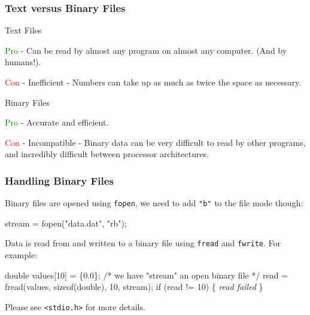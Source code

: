 \documentclass[table]{beamer}
\newif\ifschigh\schighfalse
\newcommand{\kw}[1]{\ifschigh\textcolor{red}{#1}\else\textcolor{keyword}{#1}\fi}
\newcommand{\kt}[1]{\ifschigh\textcolor{red}{#1}\else\textcolor{ctext}{#1}\fi}
\newcommand{\kc}[1]{\ifschigh\textcolor{red}{#1}\else\textcolor{comment}{#1}\fi}
\begin{document}
\begin{frame}
\frametitle{Text versus Binary Files}
\begin{block}{Text Files}
\begin{itemize}
{
\item \textcolor{green}{Pro} - Can be read by almost any program on almost any computer. (And by humans!).
}
{
\item \textcolor{red}{Con} - Inefficient - Numbers can take up as much as twice the space as necessary.}
\end{itemize}
\end{block}

\begin{block}{Binary Files}
\begin{itemize}
{
\item \textcolor{green}{Pro} - Accurate and efficient.
}
{
\item \textcolor{red}{Con} - Incompatible - Binary data can be very difficult to read by other programs, and incredibly difficult between processor architectures.}
\end{itemize}
\end{block}
\end{frame}

\begin{frame}[fragile]
\frametitle{Handling Binary Files}
Binary files are opened using {\tt fopen}, we need to add {\tt "b"} to the file mode though:
\begin{semiverbatim}
stream = fopen(\kt{"data.dat"}, \kt{"rb"});
\end{semiverbatim}
Data is read from and written to a binary file using {\tt fread} and {\tt fwrite}. For example:
\begin{semiverbatim}
\kw{double} values[10] = \{0.0\};
\kc{/* we have "stream" an open binary file */}
read = fread(values, \kw{sizeof}(\kw{double}), 10, stream);
\kw{if} (read != 10)
\{ \emph{read failed} \}
\end{semiverbatim}
\begin{block}{}
\begin{center}
Please see \kt{\tt <stdio.h>} for more details.
\end{center}
\end{block}
\end{frame}
\end{document}
